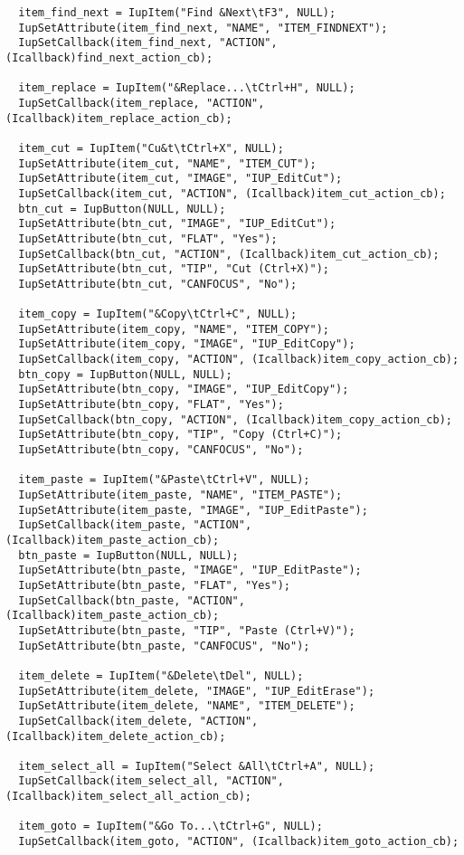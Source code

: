 \documentclass{ctexart}
\begin{document}
\begin{lstlisting}
  item_find_next = IupItem("Find &Next\tF3", NULL);
  IupSetAttribute(item_find_next, "NAME", "ITEM_FINDNEXT");
  IupSetCallback(item_find_next, "ACTION", (Icallback)find_next_action_cb);

  item_replace = IupItem("&Replace...\tCtrl+H", NULL);
  IupSetCallback(item_replace, "ACTION", (Icallback)item_replace_action_cb);

  item_cut = IupItem("Cu&t\tCtrl+X", NULL);
  IupSetAttribute(item_cut, "NAME", "ITEM_CUT");
  IupSetAttribute(item_cut, "IMAGE", "IUP_EditCut");
  IupSetCallback(item_cut, "ACTION", (Icallback)item_cut_action_cb);
  btn_cut = IupButton(NULL, NULL);
  IupSetAttribute(btn_cut, "IMAGE", "IUP_EditCut");
  IupSetAttribute(btn_cut, "FLAT", "Yes");
  IupSetCallback(btn_cut, "ACTION", (Icallback)item_cut_action_cb);
  IupSetAttribute(btn_cut, "TIP", "Cut (Ctrl+X)");
  IupSetAttribute(btn_cut, "CANFOCUS", "No");

  item_copy = IupItem("&Copy\tCtrl+C", NULL);
  IupSetAttribute(item_copy, "NAME", "ITEM_COPY");
  IupSetAttribute(item_copy, "IMAGE", "IUP_EditCopy");
  IupSetCallback(item_copy, "ACTION", (Icallback)item_copy_action_cb);
  btn_copy = IupButton(NULL, NULL);
  IupSetAttribute(btn_copy, "IMAGE", "IUP_EditCopy");
  IupSetAttribute(btn_copy, "FLAT", "Yes");
  IupSetCallback(btn_copy, "ACTION", (Icallback)item_copy_action_cb);
  IupSetAttribute(btn_copy, "TIP", "Copy (Ctrl+C)");
  IupSetAttribute(btn_copy, "CANFOCUS", "No");

  item_paste = IupItem("&Paste\tCtrl+V", NULL);
  IupSetAttribute(item_paste, "NAME", "ITEM_PASTE");
  IupSetAttribute(item_paste, "IMAGE", "IUP_EditPaste");
  IupSetCallback(item_paste, "ACTION", (Icallback)item_paste_action_cb);
  btn_paste = IupButton(NULL, NULL);
  IupSetAttribute(btn_paste, "IMAGE", "IUP_EditPaste");
  IupSetAttribute(btn_paste, "FLAT", "Yes");
  IupSetCallback(btn_paste, "ACTION", (Icallback)item_paste_action_cb);
  IupSetAttribute(btn_paste, "TIP", "Paste (Ctrl+V)");
  IupSetAttribute(btn_paste, "CANFOCUS", "No");

  item_delete = IupItem("&Delete\tDel", NULL);
  IupSetAttribute(item_delete, "IMAGE", "IUP_EditErase");
  IupSetAttribute(item_delete, "NAME", "ITEM_DELETE");
  IupSetCallback(item_delete, "ACTION", (Icallback)item_delete_action_cb);

  item_select_all = IupItem("Select &All\tCtrl+A", NULL);
  IupSetCallback(item_select_all, "ACTION", (Icallback)item_select_all_action_cb);

  item_goto = IupItem("&Go To...\tCtrl+G", NULL);
  IupSetCallback(item_goto, "ACTION", (Icallback)item_goto_action_cb);


\end{lstlisting}
\end{document}
